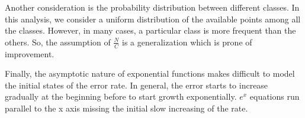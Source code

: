 \documentclass{article}
\begin{document}
Another consideration is the probability distribution between different classes. In this analysis, we consider a uniform distribution of the available points among all the classes.  However, in many cases, a particular class is more frequent than the others. So, the assumption of $\frac{N}{C}$ is a generalization which is prone of improvement.

Finally, the asymptotic nature of exponential functions makes difficult to model the initial states of the error rate.  In general, the error starts to increase gradually at the beginning before to start growth exponentially. $e^x$ equations run parallel to the x axis missing the initial slow increasing of the rate.
\end{document}
